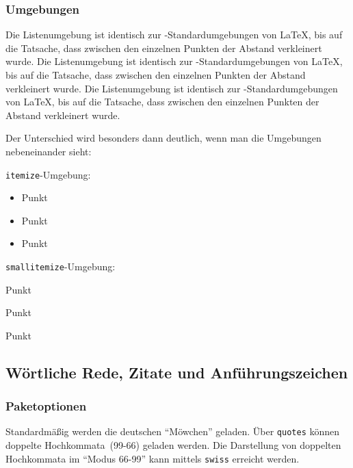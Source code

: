 \subsubsection{Umgebungen}
\begin{environments}%
     Die Listenumgebung  ist identisch zur -Standardumgebungen von \LaTeX, bis auf die Tatsache, dass zwischen den einzelnen Punkten der Abstand verkleinert wurde.
     Die Listenumgebung  ist identisch zur -Standardumgebungen von \LaTeX, bis auf die Tatsache, dass zwischen den einzelnen Punkten der Abstand verkleinert wurde.
     Die Listenumgebung  ist identisch zur -Standardumgebungen von \LaTeX, bis auf die Tatsache, dass zwischen den einzelnen Punkten der Abstand verkleinert wurde.

    Der Unterschied wird besonders dann deutlich, wenn man die Umgebungen nebeneinander sieht:
\begin{example}[gobble=4]
    \begin{minipage}[t]{.4\textwidth}
        \texttt{itemize}-Umgebung:
        \begin{itemize}
            \item Punkt
            \item Punkt
            \item Punkt
        \end{itemize}
    \end{minipage}
    \begin{minipage}[t]{.4\textwidth}
        \texttt{smallitemize}-Umgebung:
        \begin{smallitemize}
            \item Punkt
            \item Punkt
            \item Punkt
        \end{smallitemize}
    \end{minipage}
\end{example}

\end{environments}


\subsection{Wörtliche Rede, Zitate und Anführungszeichen}
\subsubsection{Paketoptionen}
\begin{options}
      Standardmäßig werden die deutschen \enquote{Möwchen}
    geladen. Über \verb|quotes| können doppelte \glqq Hochkommata\grqq\ (99-66) geladen werden. Die Darstellung
    von doppelten Hochkommata im ``Modus 66-99'' kann mittels \verb|swiss| erreicht werden.
\end{options}

